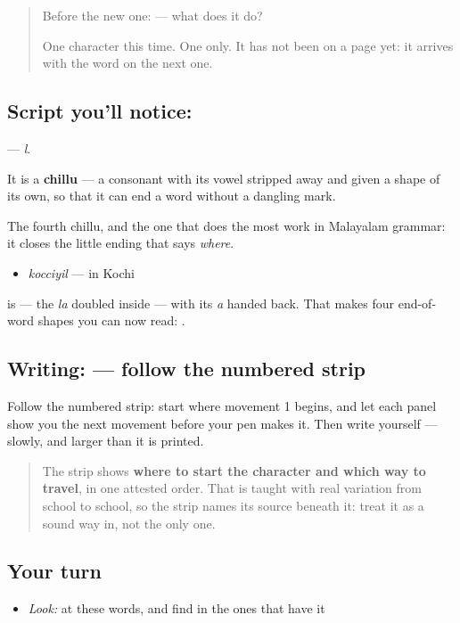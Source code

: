 \begin{quote}
Before the new one:  — what does it do?

One character this time. One only. It has not been on a page yet: it arrives with the word on the next one.
\end{quote}

\subsection*{Script you'll notice: }
\textbf{} — \emph{l}.

It is a \textbf{chillu} — a consonant with its vowel stripped away and given a shape of its own, so that it can end a word without a dangling mark.

The fourth chillu, and the one that does the most work in Malayalam grammar: it closes the little ending that says \emph{where}.

\begin{itemize}
\raggedright
  \item \textbf{} \emph{kocciyil} — in Kochi
\end{itemize}

\textbf{} is \textbf{} — the \emph{la} doubled inside \textbf{} — with its \emph{a} handed back. That makes four end-of-word shapes you can now read: \textbf{   }.

\subsection*{Writing:  — follow the numbered strip}

Follow the numbered strip: start where movement 1 begins, and let each panel show you the next movement before your pen makes it. Then write  yourself — slowly, and larger than it is printed.

\begin{quote}
The strip shows \textbf{where to start the character and which way to travel}, in one attested order. That is taught with real variation from school to school, so the strip names its source beneath it: treat it as a sound way in, not the only one.
\end{quote}

\subsection*{Your turn}
\begin{itemize}
\raggedright
  \item \emph{Look:} at these words, and find  in the ones that have it
\end{itemize}

